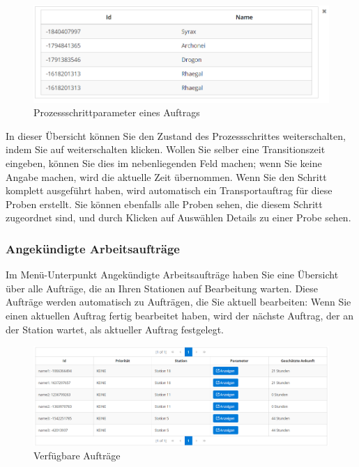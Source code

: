 \documentclass[enabledeprecatedfontcommands,fontsize=12pt,paper=a4,twoside]{scrartcl}
\begin{document}
\begin{figure}[h!]
\begin{center}
 \includegraphics[width=\textwidth]{screenshots/t/auftragparameter.png}
  \caption{Prozessschrittparameter eines Auftrags}
  \label{fig:boat1}
\end{center}
\end{figure}



In dieser Übersicht können Sie den Zustand des Prozessschrittes weiterschalten, indem Sie auf weiterschalten klicken. Wollen Sie selber eine Transitionszeit eingeben, können Sie dies im nebenliegenden Feld machen; wenn Sie keine Angabe machen, wird die aktuelle Zeit übernommen. Wenn Sie den Schritt komplett ausgeführt haben, wird automatisch ein Transportauftrag für diese Proben erstellt. Sie können ebenfalls alle Proben sehen, die diesem Schritt zugeordnet sind, und durch Klicken auf Auswählen Details zu einer Probe sehen. \\

\subsubsection{Angekündigte Arbeitsaufträge}
Im Menü-Unterpunkt Angekündigte Arbeitsaufträge haben Sie eine Übersicht über alle Aufträge, die an Ihren Stationen auf Bearbeitung warten. Diese Aufträge werden automatisch zu Aufträgen, die Sie aktuell bearbeiten: Wenn Sie einen aktuellen Auftrag fertig bearbeitet haben, wird der nächste Auftrag, der an der Station wartet, als aktueller Auftrag festgelegt. \\

\begin{figure}[h!]
\begin{center}
 \includegraphics[width=\textwidth]{screenshots/t/verfugbareauftrage.png}
  \caption{Verfügbare Aufträge}
  \label{fig:boat1}
\end{center}
\end{figure}
\end{document}
